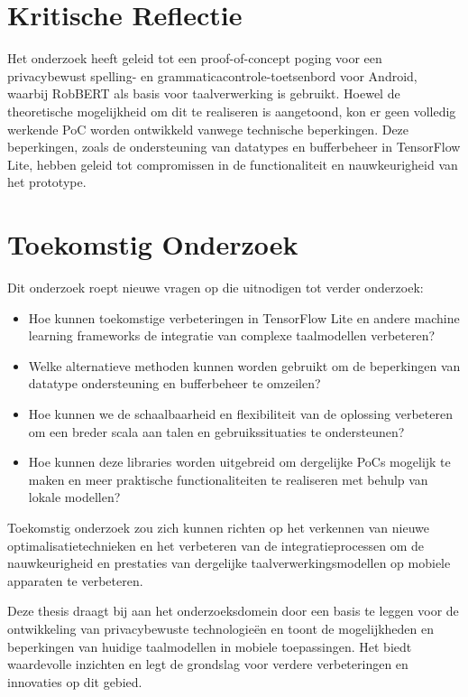 \section{Kritische Reflectie}

Het onderzoek heeft geleid tot een proof-of-concept poging voor een privacybewust spelling- en grammaticacontrole-toetsenbord voor Android, waarbij RobBERT als basis voor taalverwerking is gebruikt. Hoewel de theoretische mogelijkheid om dit te realiseren is aangetoond, kon er geen volledig werkende PoC worden ontwikkeld vanwege technische beperkingen. Deze beperkingen, zoals de ondersteuning van datatypes en bufferbeheer in TensorFlow Lite, hebben geleid tot compromissen in de functionaliteit en nauwkeurigheid van het prototype.


\section{Toekomstig Onderzoek}

Dit onderzoek roept nieuwe vragen op die uitnodigen tot verder onderzoek:
\begin{itemize}
    \item Hoe kunnen toekomstige verbeteringen in TensorFlow Lite en andere mach\-ine learning frameworks de integratie van complexe taalmodellen verbeteren?
    \item Welke alternatieve methoden kunnen worden gebruikt om de beperkingen van datatype ondersteuning en bufferbeheer te omzeilen?
    \item Hoe kunnen we de schaalbaarheid en flexibiliteit van de oplossing verbeteren om een breder scala aan talen en gebruikssituaties te ondersteunen?
    \item Hoe kunnen deze libraries worden uitgebreid om dergelijke PoCs mogelijk te maken en meer praktische functionaliteiten te realiseren met behulp van lokale modellen?
\end{itemize}

Toekomstig onderzoek zou zich kunnen richten op het verkennen van nieuwe optimalisatietechnieken en het verbeteren van de integratieprocessen om de nauwkeurigheid en prestaties van dergelijke taalverwerkingsmodellen op mobiele apparaten te verbeteren.

Deze thesis draagt bij aan het onderzoeksdomein door een basis te leggen voor de ontwikkeling van privacybewuste technologieën en toont de mogelijkheden en beperkingen van huidige taalmodellen in mobiele toepassingen. Het biedt waardevolle inzichten en legt de grondslag voor verdere verbeteringen en innovaties op dit gebied.
